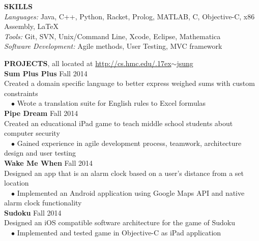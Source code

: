 \documentclass[11pt]{article}
\newcommand{\tildeText}{\raise.17ex\hbox{$\scriptstyle\sim$}}
\newcommand{\websitedisplaytext}{\small http://cs.hmc.edu/\tildeText jsung }
\newcommand{\website}{\href{http://cs.hmc.edu/~jsung}{\websitedisplaytext}}
\newcommand{\sectionNL}{\\[-2pt]}
\newcommand{\customtab}{$\hspace{10pt} \bullet \hspace{2pt}$}
\newcommand{\JudgeNudge}{\hspace{4pt}}
\newcommand{\rightAlign}{\hfill}
\begin{document}
\begin{flushleft}
{\textbf{SKILLS}} \sectionNL
\textit{Languages:} Java, C++, Python, Racket, Prolog, MATLAB, C, Objective-C, x86 Assembly, \LaTeX \\
\textit{Tools:} Git, SVN, Unix/Command Line, Xcode, Eclipse, Mathematica \\
\textit{Software Development:} Agile methods, User Testing, MVC framework
\end{flushleft}

\begin{flushleft}
{\textbf{PROJECTS}, all located at \website} \sectionNL
\textbf{Sum Plus Plus} \rightAlign Fall 2014 \\
\JudgeNudge Created a domain specific language to better express weighed sums with custom constraints \\
\customtab Wrote a translation suite for English rules to Excel formulas \\

\textbf{Pipe Dream} \rightAlign Fall 2014 \\
\JudgeNudge Created an educational iPad game to teach middle school students about computer security\\
\customtab Gained experience in agile development process, teamwork, architecture design and user testing \\

\textbf{Wake Me When} \rightAlign Fall 2014 \\
\JudgeNudge Designed an app that is an alarm clock based on a user's distance from a set location \\
\customtab Implemented an Android application using Google Maps API and native alarm clock functionality \\
 
\textbf{Sudoku} \rightAlign Fall 2014 \\
\JudgeNudge Designed an iOS compatible software architecture for the game of Sudoku \\
\customtab Implemented and tested game in Objective-C as iPad application 


\end{flushleft}
\end{document}
